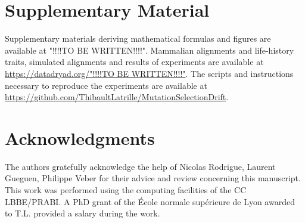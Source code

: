 \documentclass[a4paper]{MBE}
\begin{document}


\section{Supplementary Material}
Supplementary materials deriving mathematical formulas and figures are available at "!!!!TO BE WRITTEN!!!!".
Mammalian alignments and life-history traits, simulated alignments and results of experiments are available at \url{https://datadryad.org/"!!!!TO BE WRITTEN!!!!"}.
The scripts and instructions necessary to reproduce the experiments are available at \url{https://github.com/ThibaultLatrille/MutationSelectionDrift}.

\section{Acknowledgments}
The authors gratefully acknowledge the help of Nicolas Rodrigue, Laurent Gueguen, Philippe Veber for their advice and review concerning this manuscript.
This work was performed using the computing facilities of the CC LBBE/PRABI.
A PhD grant of the École normale supérieure de Lyon awarded to T.L.
provided a salary during the work.


\end{document}
